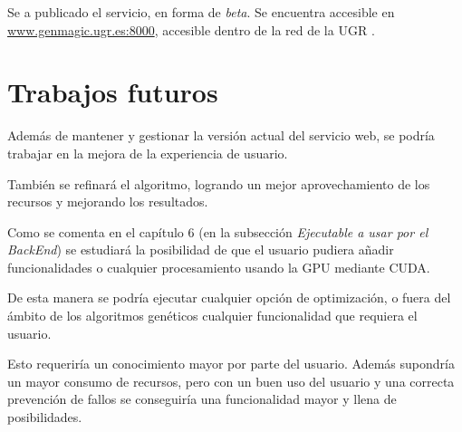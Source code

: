 Se a publicado el servicio, en forma de \textit{beta}. Se encuentra accesible en  \textcolor{blue}{\href{http://www.genmagic.ugr.es:8000}{www.genmagic.ugr.es:8000}}, accesible dentro de la red de la UGR \cite{vpnugr}.
	

\section{Trabajos futuros}

\bigskip
Además de mantener y gestionar la versión actual del servicio web, se podría trabajar en la mejora de la experiencia de usuario.

\bigskip
También se refinará el algoritmo, logrando un mejor aprovechamiento de los recursos y mejorando los resultados.

\bigskip
Como se comenta en el capítulo 6 (en la subsección \textit{Ejecutable a usar por el BackEnd}) se estudiará la posibilidad de que el usuario pudiera añadir funcionalidades o cualquier procesamiento usando la GPU mediante CUDA. 

\bigskip
De esta manera se podría ejecutar cualquier opción de optimización, o fuera del ámbito de los algoritmos genéticos cualquier funcionalidad que requiera el usuario.

\bigskip
Esto requeriría un conocimiento mayor por parte del usuario. Además supondría un mayor consumo de recursos, pero con un buen uso del usuario y una correcta prevención de fallos se conseguiría una funcionalidad mayor y llena de posibilidades. 








